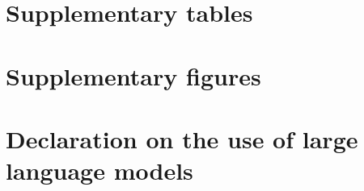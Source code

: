 \documentclass{article}
\begin{document}
\maketitle

\pagebreak

% 

% 

% 

\section{Supplementary tables} \label{sec:supp-tables}

\pagebreak

\section{Supplementary figures} \label{sec:supp-figures}


\pagebreak

\section{Declaration on the use of large language models} \label{sec:supp-use-of-llms}

\pagebreak


\end{document}
